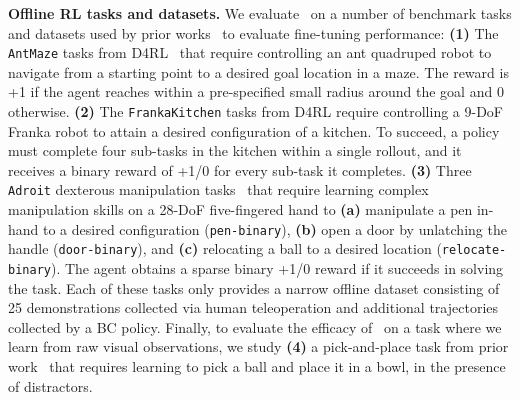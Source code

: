 \textbf{Offline RL tasks and datasets.} We evaluate \methodname\ on a number of benchmark tasks and datasets used by prior works~\cite{kostrikov2021offlineb,nair2020accelerating} to evaluate fine-tuning performance: \textbf{(1)} The {\texttt{AntMaze}} tasks from D4RL~\cite{fu2020d4rl} that require controlling an ant quadruped robot to navigate from a starting point to a desired goal location in a maze. The reward is +1 if the agent reaches within a pre-specified small radius around the goal and 0 otherwise. 
\textbf{(2)} The \texttt{FrankaKitchen} tasks from D4RL require controlling a 9-DoF Franka robot to attain a desired configuration of a kitchen. To succeed, a policy 
must complete four sub-tasks in the kitchen within a single rollout, and it receives a binary reward of +1/0 for every sub-task it completes. \textbf{(3)} Three \texttt{Adroit} dexterous manipulation tasks~\cite{rajeswaran2018dapg,kostrikov2021offlineb,nair2020accelerating} that require learning complex manipulation skills on a 28-DoF five-fingered hand to \textbf{(a)} manipulate a pen in-hand to a desired configuration (\texttt{pen-binary}), \textbf{(b)} open a door by unlatching the handle (\texttt{door-binary}), and \textbf{(c)} relocating a ball to a desired location (\texttt{relocate-binary}). The agent obtains a sparse binary +1/0 reward if it succeeds in solving the task. Each of these tasks only provides a narrow offline dataset consisting of 25 demonstrations collected via human teleoperation and additional trajectories collected by a BC policy.
Finally, to evaluate the efficacy of \methodname\ on a task where we learn from raw visual observations, we study \textbf{(4)} a pick-and-place task from prior work~\cite{singh2020cog,kumar2022pre} that requires learning to pick a ball and place it in a bowl, in the presence of distractors.


\iffalse

